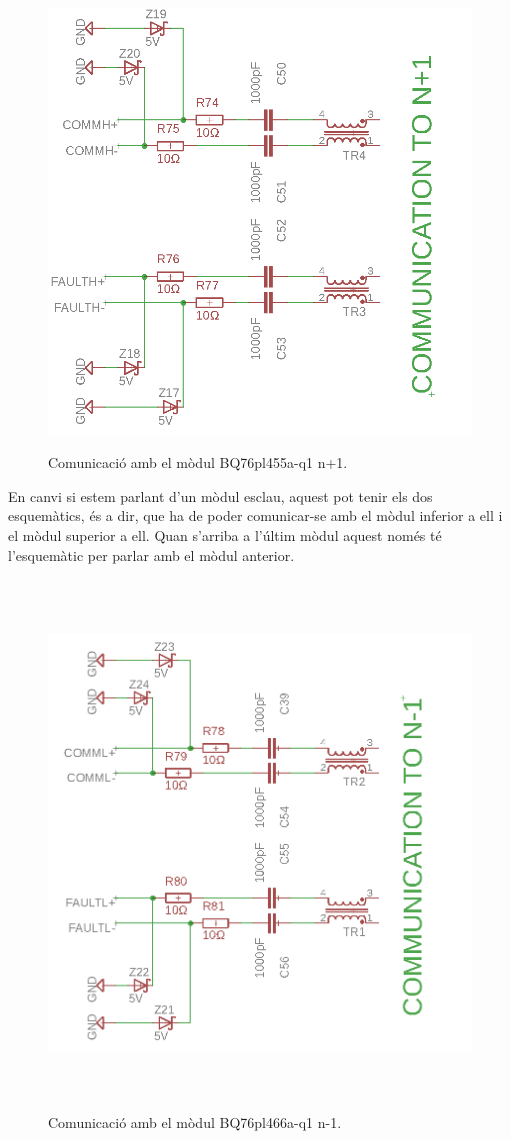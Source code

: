 \begin{figure}[H]
	\centering
    \includegraphics[width=\textwidth, height=12cm] {Prototip/schcomm+1.png}
    \caption{Comunicació amb el mòdul BQ76pl455a-q1 n+1.}
\end{figure}

\newpage

En canvi si estem parlant d'un mòdul esclau, aquest pot tenir els dos esquemàtics, és a dir, que ha de poder comunicar-se amb el mòdul inferior a ell i el mòdul superior a ell. Quan s'arriba a l'últim mòdul aquest només té l'esquemàtic per parlar amb el mòdul anterior. 

\begin{figure}[H]
	\centering
    \includegraphics[width=\textwidth, height=14cm] {Prototip/schcomm-1.png}
    \caption{Comunicació amb el mòdul BQ76pl466a-q1 n-1.}
\end{figure}

